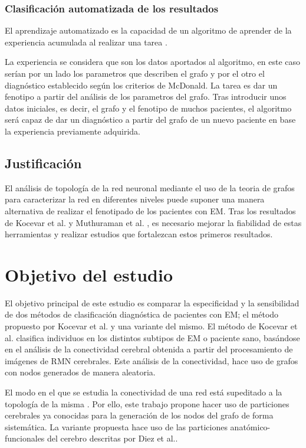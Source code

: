 \documentclass[fleqn,12pt]{UICArticle} %
\begin{document}
\subsubsection{Clasificación automatizada de los resultados}

El aprendizaje automatizado es la capacidad de un algoritmo de aprender de la experiencia acumulada al realizar una tarea \cite{Friedman1997}.

La experiencia se considera que son los datos aportados al algoritmo, en este caso serían por un lado los parametros que describen el grafo y  por el otro el diagnóstico establecido según los criterios de McDonald. La tarea es dar un fenotipo a partir del análisis de los parametros del grafo. Tras introducir unos datos iniciales, es decir, el grafo y el fenotipo de muchos pacientes, el algoritmo será capaz de dar un diagnóstico a partir del grafo de un nuevo paciente en base la experiencia previamente adquirida.


\subsection{Justificación}

El análisis de topología de la red neuronal mediante el uso de la teoria de grafos para caracterizar la red en diferentes niveles puede suponer una manera alternativa de realizar el fenotipado de los pacientes con EM. Tras los resultados de Kocevar et al.\cite{Kocevar2016} y Muthuraman et al. \cite{Muthuraman2016}, es necesario mejorar la fiabilidad de estas herramientas y realizar estudios que fortalezcan estos primeros resultados.


\section{Objetivo del estudio}

El objetivo principal de este estudio es comparar la especificidad y la sensibilidad de dos métodos de clasificación diagnóstica de pacientes con EM; el método propuesto por Kocevar et al.\cite{Kocevar2016} y una variante del mismo. El método de Kocevar et al.\cite{Kocevar2016} clasifica individuos en los distintos subtipos de EM o paciente sano, basándose en el análisis de la conectividad cerebral obtenida a partir del procesamiento de imágenes de RMN cerebrales. Este análisis de la conectividad, hace uso de grafos con nodos generados de manera aleatoria.

El modo en el que se estudia la conectividad de una red está supeditado a la topología de la misma \cite{Fornito, Zalesky2010}. Por ello, este trabajo propone hacer uso de particiones cerebrales ya conocidas para la generación de los nodos del grafo de forma sistemática. La variante propuesta hace uso de las particiones anatómico-funcionales del cerebro descritas por Diez et al.\cite{Diez2015}.
\end{document}
